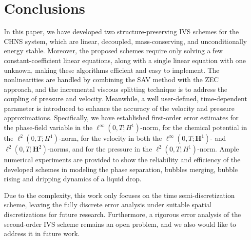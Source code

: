 \section{Conclusions}\label{conclusions}
In this paper, we have developed two structure-preserving IVS schemes for the CHNS system, which are linear, decoupled, mass-conserving, and unconditionally energy stable. Moreover, the proposed schemes require only solving a few constant-coefficient linear equations, along with a single linear equation with one unknown,  making these algorithms efficient and easy to implement. The nonlinearities are handled by combining the SAV method with the ZEC approach, and the incremental viscous splitting technique is to address the coupling of pressure and velocity. Meanwhile, a well user-defined, time-dependent parameter is introduced to enhance the accuracy of the velocity and pressure approximations. 
Specifically, we have established first-order error estimates for the phase-field variable in the $\ell^{\infty}(0,T;H^1)$-norm, for the chemical potential in the $\ell^{2}(0,T;H^1)$-norm, for the velocity in both the $\ell^{\infty}(0,T;\bm H^1)$- and $\ell^2(0,T;\bm H^2)$-norms, and for the pressure in the $\ell^2(0,T;H^1)$-norm. 
Ample numerical experiments are provided to show the reliability and efficiency of the developed schemes in modeling the phase separation, bubbles merging, bubble rising and dripping dynamics of a liquid drop.  

Due to the complexity, this work only focuses on the time semi-discretization scheme, leaving the fully discrete error analysis under suitable spatial discretizations for future research. Furthermore, a rigorous error analysis of the second-order IVS scheme remains an open problem, and we also would like to address it in future work.

%

